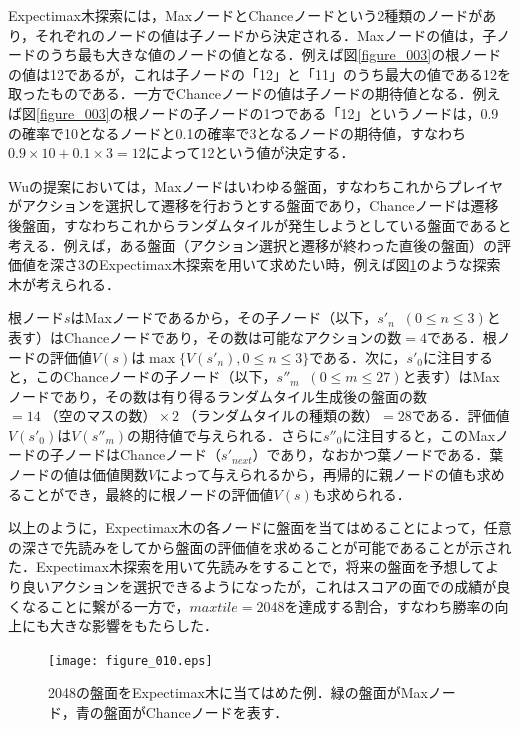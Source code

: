 \documentclass{suribt}
\begin{document}
Expectimax木探索には，MaxノードとChanceノードという2種類のノードがあり，それぞれのノードの値は子ノードから決定される．Maxノードの値は，子ノードのうち最も大きな値のノードの値となる．例えば図\ref{figure_003}の根ノードの値は12であるが，これは子ノードの「12」と「11」のうち最大の値である12を取ったものである．一方でChanceノードの値は子ノードの期待値となる．例えば図\ref{figure_003}の根ノードの子ノードの1つである「12」というノードは，0.9の確率で10となるノードと0.1の確率で3となるノードの期待値，すなわち$0.9 \times 10 + 0.1 \times 3 = 12$によって12という値が決定する．

Wuの提案においては，Maxノードはいわゆる盤面，すなわちこれからプレイヤがアクションを選択して遷移を行おうとする盤面であり，Chanceノードは遷移後盤面，すなわちこれからランダムタイルが発生しようとしている盤面であると考える．例えば，ある盤面（アクション選択と遷移が終わった直後の盤面）の評価値を深さ3のExpectimax木探索を用いて求めたい時，例えば図\ref{figure_010}のような探索木が考えられる．

根ノード$s$はMaxノードであるから，その子ノード（以下，$s'_n \;\; (0 \leq n \leq 3)$と表す）はChanceノードであり，その数は可能なアクションの数$=4$である．根ノードの評価値$V(s)$は$\max\{V(s'_n), 0 \leq n \leq 3\}$である．次に，$s'_0$に注目すると，このChanceノードの子ノード（以下，$s''_m \;\; (0 \leq m \leq 27)$と表す）はMaxノードであり，その数は有り得るランダムタイル生成後の盤面の数$=14 \; \text{（空のマスの数）} \times 2 \; \text{（ランダムタイルの種類の数）} = 28$である．評価値$V(s'_0)$は$V(s''_m)$の期待値で与えられる．さらに$s''_0$に注目すると，このMaxノードの子ノードはChanceノード（$s'_{next}$）であり，なおかつ葉ノードである．葉ノードの値は価値関数$V$によって与えられるから，再帰的に親ノードの値も求めることができ，最終的に根ノードの評価値$V(s)$も求められる．

以上のように，Expectimax木の各ノードに盤面を当てはめることによって，任意の深さで先読みをしてから盤面の評価値を求めることが可能であることが示された．Expectimax木探索を用いて先読みをすることで，将来の盤面を予想してより良いアクションを選択できるようになったが，これはスコアの面での成績が良くなることに繋がる一方で，$maxtile=2048$を達成する割合，すなわち勝率の向上にも大きな影響をもたらした．

\begin{figure}[t]
	\begin{center}
	\texttt{[image: figure\_010.eps]}
	\caption{2048の盤面をExpectimax木に当てはめた例．緑の盤面がMaxノード，青の盤面がChanceノードを表す．}
	\label{figure_010}
	\end{center}
\end{figure}
\end{document}
